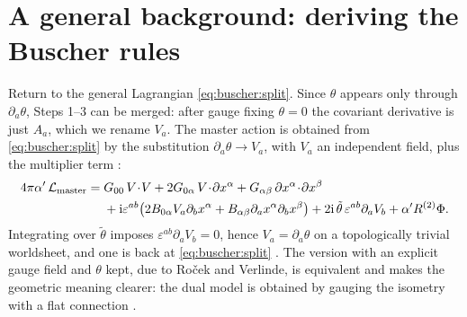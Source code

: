 \section{A general background: deriving the Buscher rules}\label{sec:buscher:rules}

Return to the general Lagrangian \eqref{eq:buscher:split}. Since $\theta$ appears only through
$\partial_a\theta$, Steps 1--3 can be merged: after gauge fixing $\theta=0$ the covariant
derivative is just $A_a$, which we rename $V_a$. The master action is obtained from
\eqref{eq:buscher:split} by the substitution $\partial_a\theta\to V_a$, with $V_a$ an
independent field, plus the multiplier term :
\begin{align}\label{eq:buscher:master}
 4\pi\alpha'\,\mathcal L_{\rm master}={}&G_{00}\,V\!\cdot\! V+2G_{0\alpha}\,V\!\cdot\!\partial x^\alpha
  +G_{\alpha\beta}\,\partial x^\alpha\!\cdot\!\partial x^\beta\notag\\
 &+\mathrm{i}\varepsilon^{ab}\big(2B_{0\alpha}V_a\partial_bx^\alpha
  +B_{\alpha\beta}\partial_ax^\alpha\partial_bx^\beta\big)
  +2\mathrm{i}\,\tilde\theta\,\varepsilon^{ab}\partial_aV_b+\alpha' R^{(2)}\Phi .
\end{align}
Integrating over $\tilde\theta$ imposes $\varepsilon^{ab}\partial_aV_b=0$, hence
$V_a=\partial_a\theta$ on a topologically trivial worldsheet, and one is back at
\eqref{eq:buscher:split} . The version with an explicit gauge
field and $\theta$ kept, due to Ro\v{c}ek and Verlinde, is equivalent and makes the geometric
meaning clearer: the dual model is obtained by gauging the isometry with a flat connection
.

